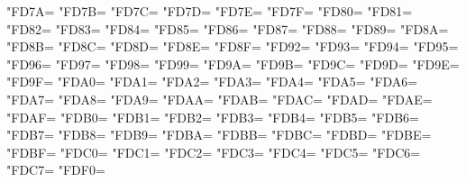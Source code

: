 \XeTeXcharclass"FD7A=\KclassArabU
\XeTeXcharclass"FD7B=\KclassArabU
\XeTeXcharclass"FD7C=\KclassArabU
\XeTeXcharclass"FD7D=\KclassArabU
\XeTeXcharclass"FD7E=\KclassArabU
\XeTeXcharclass"FD7F=\KclassArabU
\XeTeXcharclass"FD80=\KclassArabU
\XeTeXcharclass"FD81=\KclassArabU
\XeTeXcharclass"FD82=\KclassArabU
\XeTeXcharclass"FD83=\KclassArabU
\XeTeXcharclass"FD84=\KclassArabU
\XeTeXcharclass"FD85=\KclassArabU
\XeTeXcharclass"FD86=\KclassArabU
\XeTeXcharclass"FD87=\KclassArabU
\XeTeXcharclass"FD88=\KclassArabU
\XeTeXcharclass"FD89=\KclassArabU
\XeTeXcharclass"FD8A=\KclassArabU
\XeTeXcharclass"FD8B=\KclassArabU
\XeTeXcharclass"FD8C=\KclassArabU
\XeTeXcharclass"FD8D=\KclassArabU
\XeTeXcharclass"FD8E=\KclassArabU
\XeTeXcharclass"FD8F=\KclassArabU
\XeTeXcharclass"FD92=\KclassArabU
\XeTeXcharclass"FD93=\KclassArabU
\XeTeXcharclass"FD94=\KclassArabU
\XeTeXcharclass"FD95=\KclassArabU
\XeTeXcharclass"FD96=\KclassArabU
\XeTeXcharclass"FD97=\KclassArabU
\XeTeXcharclass"FD98=\KclassArabU
\XeTeXcharclass"FD99=\KclassArabU
\XeTeXcharclass"FD9A=\KclassArabU
\XeTeXcharclass"FD9B=\KclassArabU
\XeTeXcharclass"FD9C=\KclassArabU
\XeTeXcharclass"FD9D=\KclassArabU
\XeTeXcharclass"FD9E=\KclassArabU
\XeTeXcharclass"FD9F=\KclassArabU
\XeTeXcharclass"FDA0=\KclassArabU
\XeTeXcharclass"FDA1=\KclassArabU
\XeTeXcharclass"FDA2=\KclassArabU
\XeTeXcharclass"FDA3=\KclassArabU
\XeTeXcharclass"FDA4=\KclassArabU
\XeTeXcharclass"FDA5=\KclassArabU
\XeTeXcharclass"FDA6=\KclassArabU
\XeTeXcharclass"FDA7=\KclassArabU
\XeTeXcharclass"FDA8=\KclassArabU
\XeTeXcharclass"FDA9=\KclassArabU
\XeTeXcharclass"FDAA=\KclassArabU
\XeTeXcharclass"FDAB=\KclassArabU
\XeTeXcharclass"FDAC=\KclassArabU
\XeTeXcharclass"FDAD=\KclassArabU
\XeTeXcharclass"FDAE=\KclassArabU
\XeTeXcharclass"FDAF=\KclassArabU
\XeTeXcharclass"FDB0=\KclassArabU
\XeTeXcharclass"FDB1=\KclassArabU
\XeTeXcharclass"FDB2=\KclassArabU
\XeTeXcharclass"FDB3=\KclassArabU
\XeTeXcharclass"FDB4=\KclassArabU
\XeTeXcharclass"FDB5=\KclassArabU
\XeTeXcharclass"FDB6=\KclassArabU
\XeTeXcharclass"FDB7=\KclassArabU
\XeTeXcharclass"FDB8=\KclassArabU
\XeTeXcharclass"FDB9=\KclassArabU
\XeTeXcharclass"FDBA=\KclassArabU
\XeTeXcharclass"FDBB=\KclassArabU
\XeTeXcharclass"FDBC=\KclassArabU
\XeTeXcharclass"FDBD=\KclassArabU
\XeTeXcharclass"FDBE=\KclassArabU
\XeTeXcharclass"FDBF=\KclassArabU
\XeTeXcharclass"FDC0=\KclassArabU
\XeTeXcharclass"FDC1=\KclassArabU
\XeTeXcharclass"FDC2=\KclassArabU
\XeTeXcharclass"FDC3=\KclassArabU
\XeTeXcharclass"FDC4=\KclassArabU
\XeTeXcharclass"FDC5=\KclassArabU
\XeTeXcharclass"FDC6=\KclassArabU
\XeTeXcharclass"FDC7=\KclassArabU
\XeTeXcharclass"FDF0=\KclassArabU

